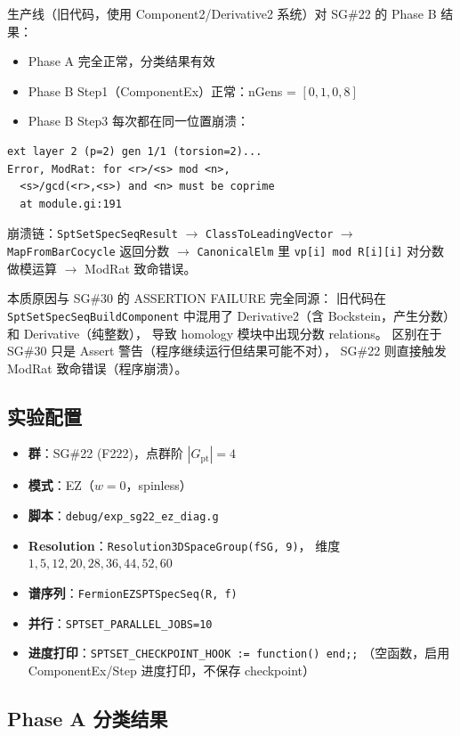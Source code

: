 \documentclass[a4paper,fontset=ubuntu,12pt]{ctexart}
\begin{document}
生产线（旧代码，使用 Component2/Derivative2 系统）对 SG\#22 的 Phase B 结果：
\begin{itemize}
\item Phase A 完全正常，分类结果有效
\item Phase B Step1（ComponentEx）正常：nGens = $[0, 1, 0, 8]$
\item Phase B Step3 每次都在同一位置崩溃：
\end{itemize}
\begin{verbatim}
ext layer 2 (p=2) gen 1/1 (torsion=2)...
Error, ModRat: for <r>/<s> mod <n>,
  <s>/gcd(<r>,<s>) and <n> must be coprime
  at module.gi:191
\end{verbatim}
崩溃链：\texttt{SptSetSpecSeqResult}
$\to$ \texttt{ClassToLeadingVector}
$\to$ \texttt{MapFromBarCocycle} 返回分数
$\to$ \texttt{CanonicalElm} 里 \texttt{vp[i] mod R[i][i]} 对分数做模运算
$\to$ ModRat 致命错误。

本质原因与 SG\#30 的 ASSERTION FAILURE 完全同源：
旧代码在 \texttt{SptSetSpecSeqBuildComponent} 中混用了
Derivative2（含 Bockstein，产生分数）和 Derivative（纯整数），
导致 homology 模块中出现分数 relations。
区别在于 SG\#30 只是 Assert 警告（程序继续运行但结果可能不对），
SG\#22 则直接触发 ModRat 致命错误（程序崩溃）。

\subsection{实验配置}

\begin{itemize}
\item \textbf{群}：SG\#22 (F222)，点群阶 $|G_\text{pt}| = 4$
\item \textbf{模式}：EZ（$w = 0$，spinless）
\item \textbf{脚本}：\texttt{debug/exp\_sg22\_ez\_diag.g}
\item \textbf{Resolution}：\texttt{Resolution3DSpaceGroup(fSG, 9)}，
      维度 $1, 5, 12, 20, 28, 36, 44, 52, 60$
\item \textbf{谱序列}：\texttt{FermionEZSPTSpecSeq(R, f)}
\item \textbf{并行}：\texttt{SPTSET\_PARALLEL\_JOBS=10}
\item \textbf{进度打印}：\texttt{SPTSET\_CHECKPOINT\_HOOK := function() end;;}
      （空函数，启用 ComponentEx/Step 进度打印，不保存 checkpoint）
\end{itemize}

\subsection{Phase A 分类结果}
\end{document}
